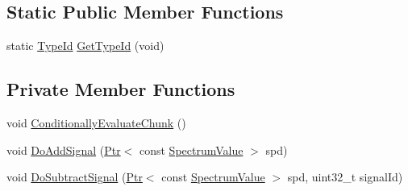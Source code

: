 \subsection*{Static Public Member Functions}
\begin{DoxyCompactItemize}
\item 
static \hyperlink{classns3_1_1TypeId}{Type\+Id} \hyperlink{classns3_1_1mmWaveInterference_af393c1da8fd9d6af65a24d8995cb1b54}{Get\+Type\+Id} (void)
\end{DoxyCompactItemize}
\subsection*{Private Member Functions}
\begin{DoxyCompactItemize}
\item 
void \hyperlink{classns3_1_1mmWaveInterference_a43c102dc879c4e32e297e4e7fff4d9f4}{Conditionally\+Evaluate\+Chunk} ()
\item 
void \hyperlink{classns3_1_1mmWaveInterference_a15ea87d4c8d9cb2b2fba1d62f2208765}{Do\+Add\+Signal} (\hyperlink{classns3_1_1Ptr}{Ptr}$<$ const \hyperlink{classns3_1_1SpectrumValue}{Spectrum\+Value} $>$ spd)
\item 
void \hyperlink{classns3_1_1mmWaveInterference_af5289e579653539b336003067abdbfef}{Do\+Subtract\+Signal} (\hyperlink{classns3_1_1Ptr}{Ptr}$<$ const \hyperlink{classns3_1_1SpectrumValue}{Spectrum\+Value} $>$ spd, uint32\+\_\+t signal\+Id)
\end{DoxyCompactItemize}
